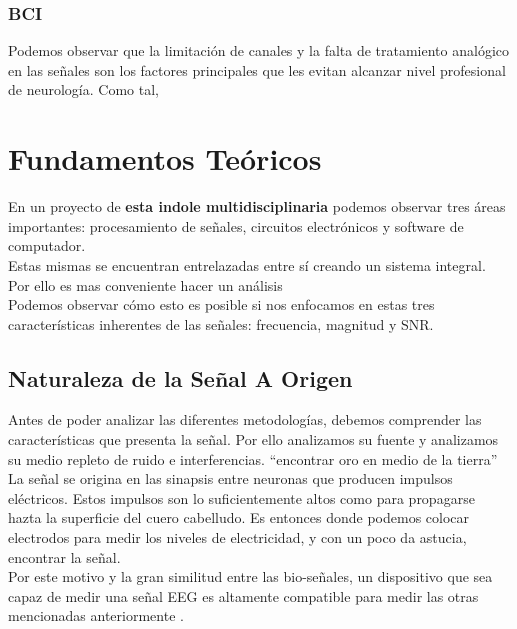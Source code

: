 \subsubsection{BCI}
\label{sec:org71c2ffd}
Podemos observar que la limitación de canales y la falta de tratamiento analógico en las señales son los factores principales que les evitan alcanzar nivel profesional de neurología. Como tal,\\

\section{Fundamentos Teóricos}
\label{sec:org893e49a}
En un proyecto de \textbf{esta indole multidisciplinaria} podemos observar tres áreas importantes: procesamiento de señales, circuitos electrónicos y software de computador.\\

Estas mismas se encuentran entrelazadas entre sí creando un sistema integral. Por ello es mas conveniente hacer un análisis\\

Podemos observar cómo esto es posible si nos enfocamos en estas tres características inherentes de las señales: frecuencia, magnitud y SNR.\\

\subsection{Naturaleza de la Señal A Origen}
\label{sec:org61ae374}
Antes de poder analizar las diferentes metodologías, debemos comprender las características que presenta la señal. Por ello analizamos su fuente y analizamos su medio repleto de ruido e interferencias. “encontrar oro en medio de la tierra”\\

La señal se origina en las sinapsis entre neuronas que producen impulsos eléctricos. Estos impulsos son lo suficientemente altos como para propagarse hazta la superficie del cuero cabelludo. Es entonces donde podemos colocar electrodos para medir los niveles de electricidad, y con un poco da astucia, encontrar la señal.\\

Por este motivo y la gran similitud entre las bio-señales, un dispositivo que sea capaz de medir una señal EEG es altamente compatible para medir las otras mencionadas anteriormente \cite{Ahamed2015}.\\

